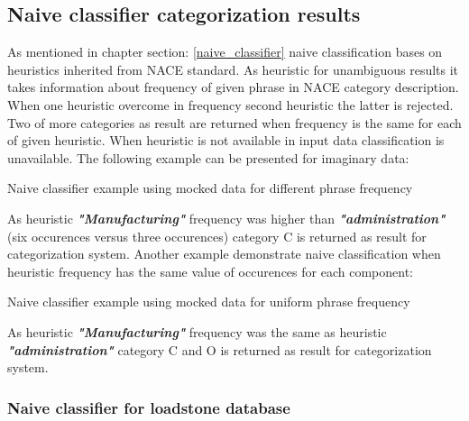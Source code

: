 \subsection{Naive classifier categorization results}
As mentioned in chapter section: \ref{naive_classifier} naive classification bases on heuristics inherited from NACE standard. As heuristic for unambiguous results it takes information about frequency of given phrase in NACE category description. When one heuristic overcome in frequency second heuristic the latter is rejected. Two of more categories as result are returned when frequency is the same for each of given heuristic. When heuristic is not available in input data classification is unavailable. The following example can be presented for imaginary data:
\begin{algorithm}
	\hfill \break
	\caption{Naive classifier example using mocked data for different phrase frequency}\label{alg:3rd}
\end{algorithm}
\newline
As heuristic \textbf{\textit{"Manufacturing"}} frequency was higher than \textbf{\textit{"administration"}} (six occurences versus three occurences) category C is returned as result for categorization system.
\newline
Another example demonstrate naive classification when heuristic frequency has the same value of occurences for each component:
\begin{algorithm}
	\hfill \break
	\caption{Naive classifier example using mocked data for uniform phrase frequency}\label{alg:4th}
\end{algorithm}
\newline  
As heuristic \textbf{\textit{"Manufacturing"}} frequency was the same as heuristic \textbf{\textit{"administration"}} category C and O is returned as result for categorization system.

\subsubsection{Naive classifier for loadstone database}

